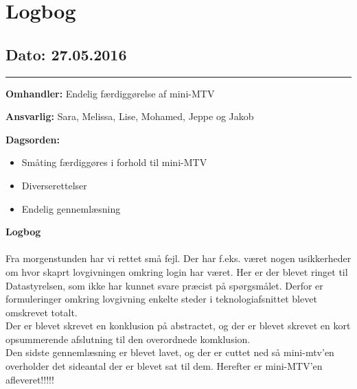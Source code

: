 \chapter{Logbog}

\section{Dato: 27.05.2016}
\hrule

\textbf{Omhandler:} Endelig færdiggørelse af mini-MTV

\textbf{Ansvarlig:} Sara, Melissa, Lise, Mohamed, Jeppe og Jakob

\textbf{Dagsorden:}
\begin{itemize}
	\item Småting færdiggøres i forhold til mini-MTV
	\item Diverserettelser
	\item Endelig gennemlæsning 
\end{itemize}

\textbf{Logbog}
\\
\\ 
Fra morgenstunden har vi rettet små fejl. Der har f.eks. været nogen usikkerheder om hvor skaprt lovgivningen omkring login har været. Her er der blevet ringet til Datastyrelsen, som ikke har kunnet svare præcist på spørgsmålet. Derfor er formuleringer omkring lovgivning enkelte steder i teknologiafsnittet blevet omskrevet totalt. 
\\
Der er blevet skrevet en konklusion på abstractet, og der er blevet skrevet en kort opsummerende afslutning til den overordnede komklusion. 
\\
Den sidste gennemlæsning er blevet lavet, og der er cuttet ned så mini-mtv'en overholder det sideantal der er blevet sat til dem. Herefter er mini-MTV'en afleveret!!!!!